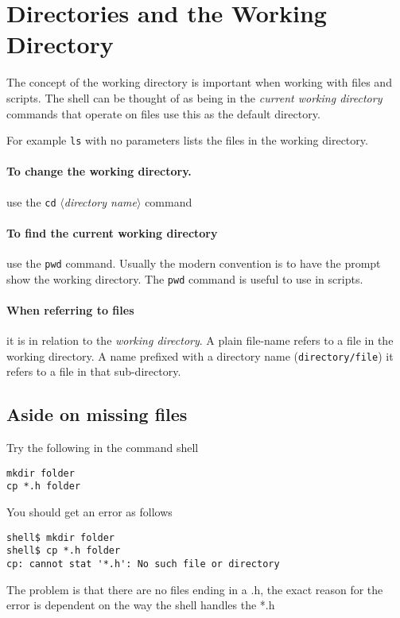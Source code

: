 \documentclass{article}
\begin{document}
\section{Directories and the Working Directory}
The concept of the working directory is important when working with
files and scripts.  The shell can be thought of as being in the
\emph{current working directory} commands that operate on files use
this as the default directory.

For example \texttt{ls} with no parameters lists the files in the
working directory.

\paragraph{To change the working directory.}  use the \texttt{cd}
$\langle$\emph{directory name}$\rangle$ command

\paragraph{To find the current working directory} use the
\texttt{pwd} command.  Usually the modern convention is to have the
prompt show the working directory.  The \texttt{pwd} command is
useful to use in scripts.

\paragraph{When referring to files} it is in relation to the
\emph{working directory}.
A plain file-name refers to a file in the working directory.  A name
prefixed with a directory name (\texttt{directory/file}) it refers to
a file in that sub-directory.

\subsection{Aside on missing files}
Try the following in the command shell
\begin{verbatim}
mkdir folder
cp *.h folder
\end{verbatim}
You should get an error as follows
\begin{verbatim}
shell$ mkdir folder
shell$ cp *.h folder
cp: cannot stat '*.h': No such file or directory
\end{verbatim}
The problem is that there are no files ending in a \textsf{.h}, the
exact reason for the error is dependent on the way the shell handles
the \textsf{*.h}
\end{document}
